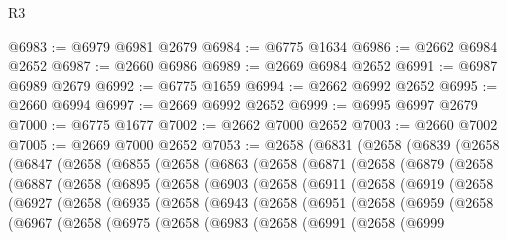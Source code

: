 \begin{lexlean}{R3}
\begin{coremodule}
@6983 := @6979 @6981 @2679
@6984 := @6775 @1634
@6986 := @2662 @6984 @2652
@6987 := @2660 @6986
@6989 := @2669 @6984 @2652
@6991 := @6987 @6989 @2679
@6992 := @6775 @1659
@6994 := @2662 @6992 @2652
@6995 := @2660 @6994
@6997 := @2669 @6992 @2652
@6999 := @6995 @6997 @2679
@7000 := @6775 @1677
@7002 := @2662 @7000 @2652
@7003 := @2660 @7002
@7005 := @2669 @7000 @2652
@7053 := @2658
    (@6831
      (@2658
        (@6839
          (@2658
            (@6847
              (@2658
                (@6855
                  (@2658
                    (@6863
                      (@2658
                        (@6871
                          (@2658
                            (@6879
                              (@2658
                                (@6887
                                  (@2658
                                    (@6895
                                      (@2658
                                        (@6903
                                          (@2658
                                            (@6911
                                              (@2658
                                                (@6919
                                                  (@2658
                                                    (@6927
                                                      (@2658
                                                        (@6935
                                                          (@2658
                                                            (@6943
                                                              (@2658
                                                                (@6951
                                                                  (@2658
                                                                    (@6959
                                                                      (@2658
                                                                        (@6967
                                                                          (@2658
                                                                            (@6975
                                                                              (@2658
                                                                                (@6983
                                                                                  (@2658
                                                                                    (@6991
                                                                                      (@2658
                                                                                        (@6999

\end{coremodule}
\end{lexlean}
